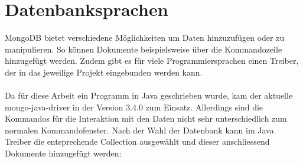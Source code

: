 \section{Datenbanksprachen}
\label{kap:Datenbanksprachen}
 
MongoDB bietet verschiedene Möglichkeiten um Daten hinzuzufügen oder zu manipulieren. So können Dokumente beispielsweise über die Kommandozeile hinzugefügt werden. Zudem gibt es für viele Programmiersprachen einen Treiber, der in das jeweilige Projekt eingebunden werden kann. 
\\\\
Da für diese Arbeit ein Programm in Java geschrieben wurde, kam der aktuelle mongo-java-driver in der Version 3.4.0 zum Einsatz. Allerdings sind die Kommandos für die Interaktion mit den Daten nicht sehr unterschiedlich zum normalen Kommandofenster. Nach der Wahl der Datenbank kann im Java Treiber  die entsprechende Collection ausgewählt und dieser anschliessend Dokumente hinzugefügt werden:
 
